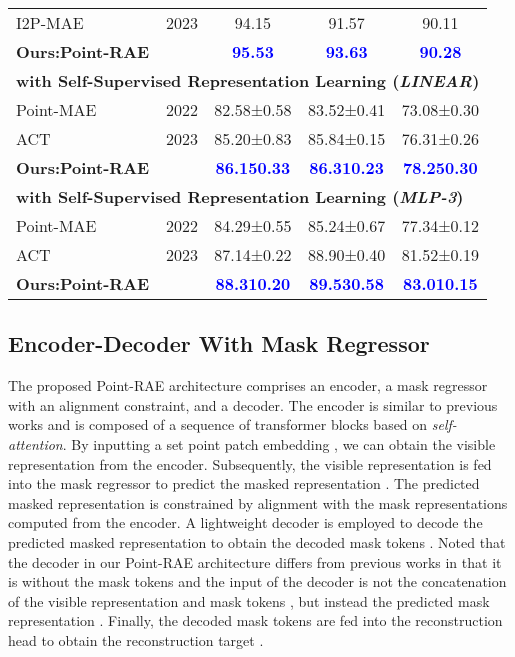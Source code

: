 \documentclass[sigconf, screen]{acmart}
\begin{document}
\begin{table}
\begin{tabular}{@{}lcccc}
I2P-MAE \cite{zhang2022learning} &2023&94.15 &91.57 &90.11 \\
\textbf{Ours:Point-RAE} & &\textcolor{blue}{\bf 95.53} &\textcolor{blue}{\bf 93.63} &\textcolor{blue}{\bf 90.28} \\
\midrule[0.5pt]
\multicolumn{5}{l}{
\hspace{-0.5em}\textbf{with Self-Supervised Representation Learning (\textit{LINEAR})}}
\\
Point-MAE \cite{pang2022masked} &2022&82.58±0.58 &83.52±0.41 &73.08±0.30\\
ACT \cite{dong2022autoencoders} &2023&85.20±0.83 &85.84±0.15 &76.31±0.26   \\
\textbf{Ours:Point-RAE} && \textcolor{blue}{\bf 86.150.33}& \textcolor{blue}{\bf 86.310.23}& \textcolor{blue}{\bf 78.250.30}\\
\midrule[0.5pt]
\multicolumn{5}{l}{
\hspace{-0.5em}\textbf{with Self-Supervised Representation Learning (\textit{MLP-3})}}
\\
Point-MAE \cite{pang2022masked}&2022 & 84.29±0.55 &85.24±0.67 &77.34±0.12\\
ACT \cite{dong2022autoencoders} &2023& 87.14±0.22  &88.90±0.40 &81.52±0.19
 \\
\textbf{Ours:Point-RAE} && \textcolor{blue}{\bf 88.310.20}& \textcolor{blue}{\bf 89.530.58}&\textcolor{blue}{\bf 83.010.15}\\
\bottomrule[1pt]

\end{tabular}
\label{scan}
\end{table}

\subsection{Encoder-Decoder With Mask Regressor}
The proposed Point-RAE architecture comprises an encoder, a mask regressor with an alignment constraint, and a decoder. The encoder is similar to previous works and is composed of a sequence of transformer blocks based on \textit{self-attention}. 
By inputting a set point patch embedding , we can obtain the visible representation  from the encoder. Subsequently, the visible representation  is fed into the mask regressor to predict the masked representation . The predicted masked representation  is constrained by alignment with the mask representations  computed from the encoder. A lightweight decoder is employed to decode the predicted masked representation  to obtain the decoded mask tokens . 
Noted that the decoder in our Point-RAE architecture differs from previous works in that it is without the mask tokens and the input of the decoder is not the concatenation of the visible representation  and mask tokens , but instead the predicted mask representation . 
Finally, the decoded mask tokens  are fed into the reconstruction head to obtain the reconstruction target .
\end{document}
